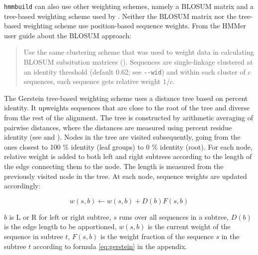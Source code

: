 \texttt{hmmbuild} can also use other weighting schemes, namely a BLOSUM matrix
and a tree-based weighting scheme used by \cite{gerstein1994}. Neither the
BLOSUM matrix nor the tree-based weighting scheme use position-based sequence
weights. From the HMMer user guide about the BLOSUM approach:

\begin{quote}
	Use the same clustering scheme that was used to weight data in calculating
	BLOSUM subsitution matrices (\cite{henikoff1994}). Sequences are
	single-linkage clustered at an identity threshold (default 0.62; see
	\lstinline{--wid}) and within each cluster of $c$ sequences, each sequence
	gets relative weight $1/c$. 
\end{quote}

The Gerstein tree-based weighting scheme uses a distance tree based on percent
identity. It upweights sequences that are close to the root of the tree and
diverse from the rest of the alignment. The tree is constructed by arithmetic
averaging of pairwise distances, where the distances are measured using percent
residue identity (see \cite{nei1987} and \cite{sneath1973}). Nodes in the tree
are visited subsequently, going from the ones closest to 100 \% identity (leaf
groups) to 0 \% identity (root). For each node, relative weight is added to both
left and right subtrees according to the length of the edge connecting them to
the node. The length is measured from the previously visited node in the tree.
At each node, sequence weights are updated accordingly:

\begin{equation}
	w(s,b) \leftarrow w(s,b) + D(b)F(s,b)
	\label{eq:gerstein}
\end{equation}

$b$ is L or R for left or right subtree, $s$ runs over all sequences in a
subtree, $D(b)$ is the edge length to be apportioned, $w(s,b)$ is the current
weight of the sequence in subtree $t$, $F(s,b)$ is the weight fraction of the
sequence $s$ in the subtree $t$ according to formula \ref{eq:gerstein} in the
appendix.

